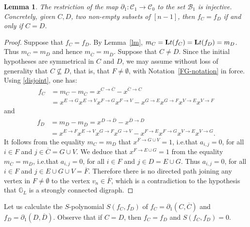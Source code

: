 \documentclass[10pt]{amsart}
\newcommand{\ie}{i.e.}
\newcommand{\mbg}{\mbox{$\mathbb{G}$}}
\newcommand{\lt}{\mbox{${\bf L}{\rm t}$}}
\newcommand{\mcb}{\mbox{$\mathcal{B}$}}
\newcommand{\mcc}{\mbox{$\mathcal{C}$}}
\newcommand{\dif}{\mbox{$\partial$}}
\newtheorem{lemma}[cdrthm]{Lemma}
\theoremstyle{definition}
\theoremstyle{remark}
\begin{document}
\begin{lemma}\label{fc=fd}
The restriction of the map $\dif_1:\mcc_1\to\mcc_0$ to the set
$\mcb_1$ is injective. Concretely, given $C,D$, two non-empty subsets
of $[n-1]$, then $f_C=f_D$ if and only if $C=D$.
\end{lemma}
\begin{proof}
Suppose that $f_C=f_D$. By Lemma~\ref{lm},
$m_C=\lt(f_C)=\lt(f_D)=m_D$. Thus $m_C=m_D$ and hence
$m_{\overline{C}}=m_{\overline{D}}$. Suppose that $C\neq D$. Since the
initial hypotheses are symmetrical in $C$ and $D$, we may assume
without loss of generality that $C\not\subseteq D$, that is, that
$F\neq\emptyset$, with Notation~\ref{FG-notation} in force. Using
\eqref{disjoint}, one has:
\begin{align*}
f_C & = m_{C}-m_{\overline{C}}=x^{C\to \overline{C}}-x^{\overline{C}\to C}\\&=
  x^{E\to G}x^{E\to V}x^{F\to G}x^{F\to V}-x^{G\to E}x^{G\to F}x^{V\to
    E}x^{V\to F}
\end{align*}
and 
\begin{align*}
f_D & =  m_{D}-m_{\overline{D}}=x^{D\to \overline{D}}-x^{\overline{D}\to
    D}\\ &= x^{E\to F}x^{E\to V}x^{G\to F}x^{G\to V}-x^{F\to
    E}x^{F\to G}x^{V\to E}x^{V\to G}.
\end{align*}
It follows from the equality $m_C=m_D$ that $x^{F\to G\cup V}=1$,
\ie that $a_{i,j}=0$, for all $i\in F$ and $j\in \overline{C}=G\cup
V$. We deduce that $x^{F\to E\cup G}=1$ from the equality
$m_{\overline{C}}=m_{\overline{D}}$, \ie that $a_{i,j}=0$, for all
$i\in F$ and $j\in D=E\cup G$. Thus $a_{i,j}=0$, for all $i\in F$ and
$j\in E\cup G\cup V=\overline{F}$. Therefore there is no directed path
joining any vertex in $F\neq\emptyset$ to the vertex $v_n\in
\overline{F}$, which is a contradiction to the hypothesis that
$\mbg_L$ is a strongly connected digraph.
\end{proof}

Let us calculate the $S$-polynomial $S(f_C,f_D)$ of
$f_C=\dif_1(C,\overline{C})$ and $f_D=\dif_1(D,\overline{D})$.
Observe that if $C=D$, then $f_C=f_D$ and $S(f_C,f_D)=0$.
\end{document}
